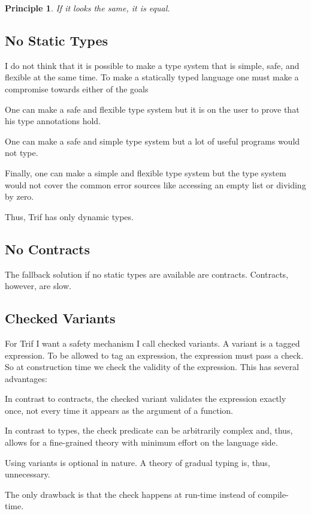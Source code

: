 \documentclass{article}
\newtheorem{principle}{Principle}
\begin{document}
  \begin{principle}
  	If it looks the same, it is equal.
  \end{principle}

  \subsection{No Static Types}

  I do not think that it is possible to make a type system that is simple, safe, and flexible at the same time. To make a statically typed language one must make a compromise towards either of the goals
  \begin{inparaenum}[(i)]
    \item One can make a safe and flexible type system but it is on the user to prove that his type annotations hold.
    \item One can make a safe and simple type system but a lot of useful programs would not type.
    \item Finally, one can make a simple and flexible type system but the type system would not cover the common error sources like accessing an empty list or dividing by zero.
  \end{inparaenum}
  Thus, Trif has only dynamic types.

  \subsection{No Contracts}

  The fallback solution if no static types are available are contracts. Contracts, however, are slow.

  \subsection{Checked Variants}

  For Trif I want a safety mechanism I call checked variants. A variant is a tagged expression. To be allowed to tag an expression, the expression must pass a check. So at construction time we check the validity of the expression. This has several advantages:
  \begin{inparaenum}[(i)]
  	\item In contrast to contracts, the checked variant validates the expression exactly once, not every time it appears as the argument of a function.
  	\item In contrast to types, the check predicate can be arbitrarily complex and, thus, allows for a fine-grained theory with minimum effort on the language side.
  	\item Using variants is optional in nature. A theory of gradual typing is, thus, unnecessary.
  	\item The only drawback is that the check happens at run-time instead of compile-time.
  \end{inparaenum}
\end{document}
